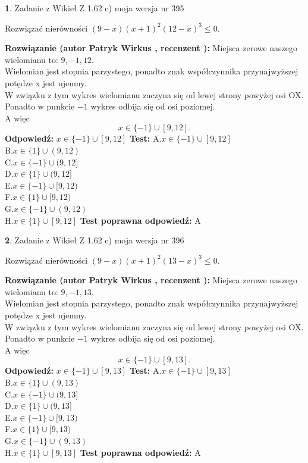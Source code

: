 \documentclass[12pt, a4paper]{article}
\theoremstyle{definition} %
\newtheorem{zad}{}
\newcommand{\zadStart}[1]{\begin{zad}#1\newline}
\newcommand{\zadStop}{\end{zad}}
\newcommand{\rozwStart}[2]{\noindent \textbf{Rozwiązanie (autor #1 , recenzent #2): }\newline}
\newcommand{\rozwStop}{\newline}
\newcommand{\odpStart}{\noindent \textbf{Odpowiedź:}\newline}
\newcommand{\odpStop}{\newline}
\newcommand{\testStart}{\noindent \textbf{Test:}\newline}
\newcommand{\testStop}{\newline}
\newcommand{\kluczStart}{\noindent \textbf{Test poprawna odpowiedź:}\newline}
\newcommand{\kluczStop}{\newline}
\begin{document}
\zadStart{Zadanie z Wikieł Z 1.62 c) moja wersja nr 395}

Rozwiązać nierówności $(9-x)(x+1)^{2}(12-x)^{3}\le0$.
\zadStop
\rozwStart{Patryk Wirkus}{}
Miejsca zerowe naszego wielomianu to: $9, -1, 12$.\\
Wielomian jest stopnia parzystego, ponadto znak współczynnika przy\linebreak najwyższej potędze x jest ujemny.\\ W związku z tym wykres wielomianu zaczyna się od lewej strony powyżej osi OX.\\
Ponadto w punkcie $-1$ wykres odbija się od osi poziomej.\\
A więc $$x \in \{-1\} \cup [9,12].$$
\rozwStop
\odpStart
$x \in \{-1\} \cup [9,12]$
\odpStop
\testStart
A.$x \in \{-1\} \cup [9,12]$\\
B.$x \in \{1\} \cup (9,12)$\\
C.$x \in \{-1\} \cup (9,12]$\\
D.$x \in \{1\} \cup (9,12]$\\
E.$x \in \{-1\} \cup [9,12)$\\
F.$x \in \{1\} \cup [9,12)$\\
G.$x \in \{-1\} \cup (9,12)$\\
H.$x \in \{1\} \cup [9,12]$
\testStop
\kluczStart
A
\kluczStop



\zadStart{Zadanie z Wikieł Z 1.62 c) moja wersja nr 396}

Rozwiązać nierówności $(9-x)(x+1)^{2}(13-x)^{3}\le0$.
\zadStop
\rozwStart{Patryk Wirkus}{}
Miejsca zerowe naszego wielomianu to: $9, -1, 13$.\\
Wielomian jest stopnia parzystego, ponadto znak współczynnika przy\linebreak najwyższej potędze x jest ujemny.\\ W związku z tym wykres wielomianu zaczyna się od lewej strony powyżej osi OX.\\
Ponadto w punkcie $-1$ wykres odbija się od osi poziomej.\\
A więc $$x \in \{-1\} \cup [9,13].$$
\rozwStop
\odpStart
$x \in \{-1\} \cup [9,13]$
\odpStop
\testStart
A.$x \in \{-1\} \cup [9,13]$\\
B.$x \in \{1\} \cup (9,13)$\\
C.$x \in \{-1\} \cup (9,13]$\\
D.$x \in \{1\} \cup (9,13]$\\
E.$x \in \{-1\} \cup [9,13)$\\
F.$x \in \{1\} \cup [9,13)$\\
G.$x \in \{-1\} \cup (9,13)$\\
H.$x \in \{1\} \cup [9,13]$
\testStop
\kluczStart
A
\kluczStop
\end{document}
